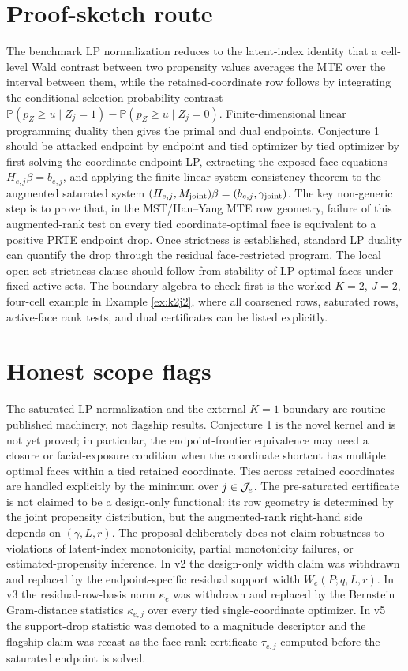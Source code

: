 \documentclass[11pt]{article}
\renewcommand{\Pr}{\mathbb{P}}
\theoremstyle{definition}
\theoremstyle{plain}
\theoremstyle{remark}
\begin{document}
\section{Proof-sketch route}
The benchmark LP normalization reduces to the latent-index identity that a
cell-level Wald contrast between two propensity values averages the MTE over
the interval between them, while the retained-coordinate row follows by
integrating the conditional selection-probability contrast
\(\Pr(p_Z\ge u\mid Z_j=1)-\Pr(p_Z\ge u\mid Z_j=0)\).  Finite-dimensional
linear programming duality then gives the primal and dual endpoints.
Conjecture 1 should be attacked endpoint by endpoint and tied optimizer by
tied optimizer by first solving the coordinate endpoint LP, extracting the
exposed face equations \(H_{e,j}\beta=b_{e,j}\), and applying the finite
linear-system consistency theorem to the augmented saturated system
\((H_{e,j},M_{\rm joint})\beta=(b_{e,j},\gamma_{\rm joint})\).  The key
non-generic step is to prove that, in the MST/Han--Yang MTE row geometry,
failure of this augmented-rank test on every tied coordinate-optimal face is
equivalent to a positive PRTE endpoint drop.  Once strictness is established,
standard LP duality can quantify the drop through the residual
face-restricted program.  The local open-set strictness clause should follow
from stability of LP optimal faces under fixed active sets.  The boundary
algebra to check first is the worked \(K=2\), \(J=2\), four-cell example in
Example \ref{ex:k2j2}, where all coarsened rows, saturated rows, active-face
rank tests, and dual certificates can be listed explicitly.

\section{Honest scope flags}
The saturated LP normalization and the external \(K=1\) boundary are routine
published machinery, not flagship results.  Conjecture 1 is the novel kernel
and is not yet proved; in particular, the endpoint-frontier equivalence may
need a closure or facial-exposure condition when the coordinate shortcut has
multiple optimal faces within a tied retained coordinate.  Ties across
retained coordinates are handled explicitly by the minimum over
\(j\in{\cal J}_e\).  The pre-saturated certificate is not claimed to be a
design-only functional: its row geometry is determined by the joint propensity
distribution, but the augmented-rank right-hand side depends on
\((\gamma,L,r)\).  The proposal deliberately does not claim
robustness to violations of latent-index monotonicity, partial monotonicity
failures, or estimated-propensity inference.  In v2 the design-only width
claim was withdrawn and replaced by the endpoint-specific residual support
width \(W_e(P;q,L,r)\).  In v3 the residual-row-basis norm \(\kappa_e\) was
withdrawn and replaced by the Bernstein Gram-distance statistics
\(\kappa_{e,j}\) over every tied single-coordinate optimizer.  In v5 the
support-drop statistic was demoted to a magnitude descriptor and the flagship
claim was recast as the face-rank certificate \(\tau_{e,j}\) computed before
the saturated endpoint is solved.
\end{document}
